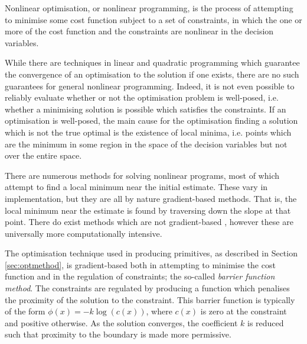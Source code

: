 Nonlinear optimisation, or nonlinear programming, is the process of attempting to minimise some cost function subject to a set of constraints, in which the one or more of the cost function and the constraints are nonlinear in the decision variables. 

While there are techniques in linear and quadratic programming which guarantee the convergence of an optimisation to the solution if one exists, there are no such guarantees for general nonlinear programming. Indeed, it is not even possible to reliably evaluate whether or not the optimisation problem is well-posed, i.e. whether a minimising solution is possible which satisfies the constraints. If an optimisation is well-posed, the main cause for the optimisation finding a solution which is not the true optimal is the existence of local minima, i.e. points which are the minimum in some region in the space of the decision variables but not over the entire space.

There are numerous methods for solving nonlinear programs, most of which attempt to find a local minimum near the initial estimate. These vary in implementation, but they are all by nature gradient-based methods. That is, the local minimum near the estimate is found by traversing down the slope at that point. There do exist methods which are not gradient-based \cite{perez2007particle, li2005multi}, however these are universally more computationally intensive.

The optimisation technique used in producing primitives, as described in Section \ref{sec:optmethod}, is gradient-based both in attempting to minimise the cost function and in the regulation of constraints; the so-called \textit{barrier function method}. The constraints are regulated by producing a function which penalises the proximity of the solution to the constraint. This barrier function is typically of the form $\phi(x)=-k\log(c(x))$, where $c(x)$ is zero at the constraint and positive otherwise. As the solution converges, the coefficient $k$ is reduced such that proximity to the boundary is made more permissive.